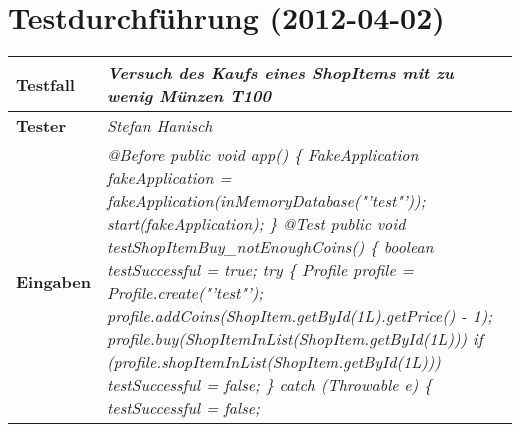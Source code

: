 
\chapter{Testdurchführung (2012-04-02)}



\begin{longtable}{|p{4cm}|p{11cm}|}
\hline
\textbf{Testfall} & \textit{Versuch des Kaufs eines ShopItems mit zu wenig Münzen \textbf{T100}} \\
\hline
\textbf{Tester} & \textit{Stefan Hanisch} \\
\hline
\textbf{Eingaben} & \textit{@Before \newline
public void app() \{ \newline
\hspace*{1mm}FakeApplication fakeApplication \newline
\hspace*{4mm}= fakeApplication(inMemoryDatabase("'test"'));\newline
\hspace*{1mm}start(fakeApplication); \newline
\} \newline
\newline
@Test \newline
public void testShopItemBuy\_notEnoughCoins() \{\newline
\hspace*{1mm}boolean testSuccessful = true; \newline
\hspace*{1mm}try \{\newline
\hspace*{3mm}Profile profile = Profile.create("'test"');\newline
\hspace*{3mm}profile.addCoins(ShopItem.getById(1L).getPrice() - 1);\newline
\hspace*{3mm}profile.buy(ShopItemInList(ShopItem.getById(1L)))\newline
\hspace*{3mm}if (profile.shopItemInList(ShopItem.getById(1L)))\newline
\hspace*{5mm}testSuccessful = false; \newline
\hspace*{1mm}\} catch (Throwable e) \{ \newline
\hspace*{3mm}testSuccessful = false; \newline 
}
\end{longtable}
